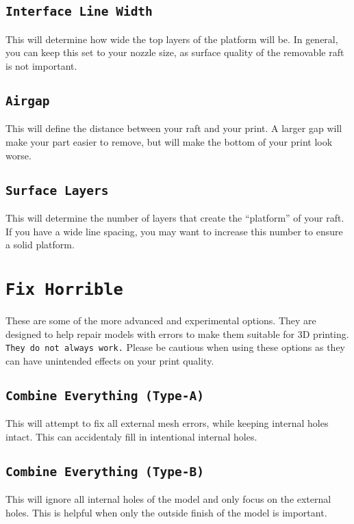 \subsection{\texttt{Interface Line Width}}
This will determine how wide the top layers of the platform will be. In general, you can keep this set to your nozzle size, as surface quality of the removable raft is not important.

\subsection{\texttt{Airgap}}
This will define the distance between your raft and your print. A larger gap will make your part easier to remove, but will make the bottom of your print look worse.

\subsection{\texttt{Surface Layers}}
This will determine the number of layers that create the “platform” of your raft. If you have a wide line spacing, you may want to increase this number to ensure a solid platform. 

\section{\texttt{Fix Horrible}}
These are some of the more advanced and experimental options. They are designed to help repair models with errors to make them suitable for 3D printing. \texttt{They do not always work.} Please be cautious when using these options as they can have unintended effects on your print quality.

\subsection{\texttt{Combine Everything (Type-A)}}
This will attempt to fix all external mesh errors, while keeping internal holes intact. This can accidentaly fill in intentional internal holes.

\subsection{\texttt{Combine Everything (Type-B)}}
This will ignore all internal holes of the model and only focus on the external holes. This is helpful when only the outside finish of the model is important.

